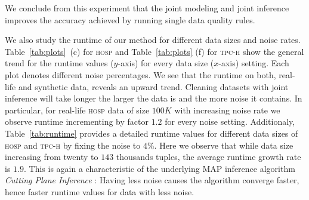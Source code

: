 We conclude from this experiment that the joint modeling and joint inference improves the accuracy achieved by running single data quality rules.

We also study the runtime of our method for different data sizes and noise rates. Table~\ref{tab:plots}~(c) for \textsc{hosp} and Table~\ref{tab:plots} (f) for \textsc{tpc-h} show the general trend for the runtime values ($y$-axis) for every data size ($x$-axis) setting. Each plot denotes different noise percentages. We see that the runtime on both, real-life and synthetic data, reveals an upward trend. Cleaning datasets with joint inference will take longer the larger the data is and the more noise it contains. In particular, for real-life \textsc{hosp} data of size $100K$ with increasing noise rate we observe runtime incrementing by factor $1.2$ for every noise setting. 
Additionaly, Table~\ref{tab:runtime} provides a detailed runtime values for different data sizes of \textsc{hosp} and \textsc{tpc-h} by fixing the noise to $4\%$. Here we observe that while data size increasing from twenty to $143$ thousands tuples, the average runtime growth rate is $1.9$. 
This is again a characteristic of the underlying MAP inference algorithm \textit{Cutting Plane Inference} \cite{riedel08improving}: Having less noise causes the algorithm converge faster, hence faster runtime values for data with less noise. %


